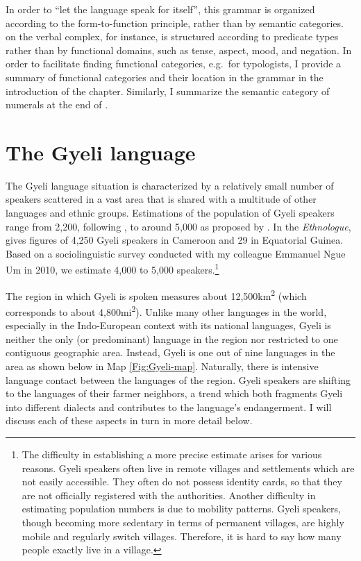 In order to ``let the language speak for itself'', this grammar is organized according to the form-to-function principle, rather than by semantic categories.  on the verbal complex, for instance, is structured according to predicate types rather than by functional domains, such as tense, aspect, mood, and negation. In order  to facilitate finding functional categories, e.g.\ for typologists, I provide a summary of functional categories and their location in the grammar in the introduction of the chapter. Similarly, I summarize the semantic category of numerals at the end of .


 


\section{The Gyeli language}
\label{sec:Gyeli}

The Gyeli language situation is characterized by a relatively small number of  speakers scattered in a vast area that is shared with a multitude of other languages and ethnic groups.
Estimations of the population of Gyeli speakers range from 2,200, following \citet[27]{renaud76}, to around 5,000 as proposed by \citet[215]{ngima2001}. In the \textit{Ethnologue}, \citet{lewis09} gives figures of 4,250 Gyeli speakers in Cameroon and 29 in Equatorial Guinea. Based on a sociolinguistic survey conducted with my colleague Emmanuel Ngue Um in 2010,  we estimate 4,000 to 5,000 speakers.\footnote{The difficulty in establishing a more precise estimate arises for various reasons. Gyeli speakers often live in remote villages and settlements which are not easily accessible. They often do not possess identity cards, so that they are not officially registered with the authorities. Another difficulty in estimating population numbers is due to mobility patterns. Gyeli speakers, though becoming more sedentary in terms of permanent villages, are highly mobile and regularly switch villages. Therefore, it is hard to say how many people exactly live in a village.}

The region in which Gyeli is spoken measures about 12,500km\textsuperscript{2} (which corresponds to about 4,800mi\textsuperscript{2}). Unlike many other languages in the world, especially in the Indo-European context with its national languages, Gyeli is neither the only (or predominant) language in the region nor restricted to one contiguous geographic area. Instead, Gyeli is one out of nine languages in the area as shown below in Map \ref{Fig:Gyeli-map}.  Naturally, there is intensive language contact between the languages of the region. Gyeli speakers are shifting to the languages of their farmer neighbors, a trend which both fragments Gyeli into different dialects and contributes to the language's endangerment.  I will discuss each of these aspects in turn in more detail below.


